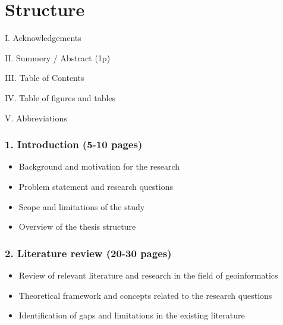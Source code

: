 
\chapter{Structure} %

\label{Structure} %

\newcommand{\keyword}[1]{\textbf{\#1}}
\newcommand{\tabhead}[1]{\textbf{\#1}}
\newcommand{\code}[1]{\texttt{\#1}}
\newcommand{\file}[1]{\texttt{\bfseries\#1}}
\newcommand{\option}[1]{\texttt{\itshape\#1}}



I. Acknowledgements

II. Summery / Abstract (1p)

III. Table of Contents

IV. Table of figures and tables

V. Abbreviations

\subsection*{1. Introduction (5-10 pages)}
\begin{itemize}
\item Background and motivation for the research
\item Problem statement and research questions
\item Scope and limitations of the study
\item Overview of the thesis structure
\end{itemize}

\subsection*{2. Literature review (20-30 pages)}
\begin{itemize}
\item Review of relevant literature and research in the field of geoinformatics
\item Theoretical framework and concepts related to the research questions
\item Identification of gaps and limitations in the existing literature
\end{itemize}

